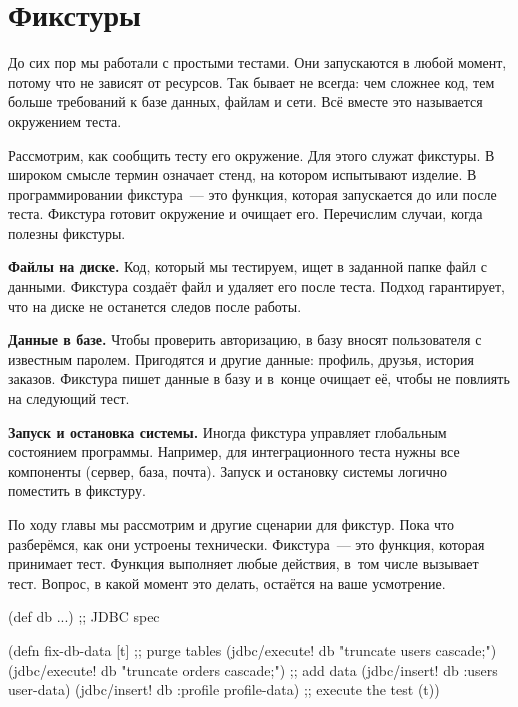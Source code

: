 \fi

\section{Фикстуры}


До сих пор мы работали с простыми тестами. Они запускаются в любой момент,
потому что не зависят от ресурсов. Так бывает не всегда: чем сложнее код, тем
больше требований к базе данных, файлам и сети. Всё вместе это называется
окружением теста.

Рассмотрим, как сообщить тесту его окружение. Для этого служат фикстуры. В
широком смысле термин означает стенд, на котором испытывают изделие. В
программировании фикстура~--- это функция, которая запускается до или после
теста. Фикстура готовит окружение и очищает его. Перечислим случаи, когда
полезны фикстуры.


\textbf{Файлы на диске.} Код, который мы тестируем, ищет в заданной папке файл с
данными. Фикстура создаёт файл и удаляет его после теста. Подход гарантирует,
что на диске не останется следов после работы.

\textbf{Данные в базе.} Чтобы проверить авторизацию, в базу вносят пользователя
с известным паролем. Пригодятся и другие данные: профиль, друзья, история
заказов. Фикстура пишет данные в базу и в~конце очищает её, чтобы не повлиять на
следующий тест.

\textbf{Запуск и остановка системы.} Иногда фикстура управляет глобальным
состоянием программы. Например, для интеграционного теста нужны все компоненты
(сервер, база, почта). Запуск и остановку системы логично поместить в фикстуру.

По ходу главы мы рассмотрим и другие сценарии для фикстур. Пока что разберёмся,
как они устроены технически. Фикстура~--- это функция, которая принимает
тест. Функция выполняет любые действия, в~том числе вызывает тест. Вопрос, в
какой момент это делать, остаётся на ваше усмотрение.


\ifx\devicetype\mobile

\begin{english}
  \begin{clojure}
(def db {...}) ;; JDBC spec

(defn fix-db-data [t]
  ;; purge tables
  (jdbc/execute! db
    "truncate users cascade;")
  (jdbc/execute! db
    "truncate orders cascade;")
  ;; add data
  (jdbc/insert! db :users user-data)
  (jdbc/insert! db
    :profile profile-data)
  ;; execute the test
  (t))
  \end{clojure}
\end{english}

